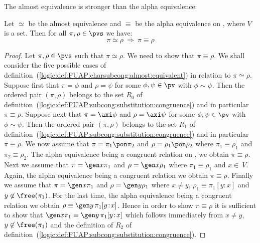 The almost equivalence is stronger than the alpha equivalence:

\begin{prop}\label{logic:prop:FUAP:subcong:almost:implies:sub:congruence}
Let $\simeq$ be the almost equivalence and $\equiv$ be the
alpha equivalence on \pvs, where $V$ is a set. Then for all
$\pi,\rho\in\pvs$ we have:
    \[
    \pi\simeq\rho\ \Rightarrow\ \pi\equiv\rho
    \]
\end{prop}
\begin{proof}
Let $\pi,\rho\in\pvs$ such that $\pi\simeq\rho$. We need to show
that $\pi\equiv\rho$. We shall consider the five possible cases of
definition~(\ref{logic:def:FUAP:charsubcong:almost:equivalent}) in
relation to $\pi\simeq\rho$. Suppose first that $\pi=\phi$ and
$\rho=\psi$ for some $\phi,\psi\in\pv$ with $\phi\sim\psi$. Then the
ordered pair $(\pi,\rho)$ belongs to the set $R_{0}$ of
definition~(\ref{logic:def:FUAP:subcong:substitution:congruence})
and in particular $\pi\equiv\rho$. Suppose next that $\pi=\axi\phi$
and $\rho=\axi\psi$ for some $\phi,\psi\in\pv$ with $\phi\sim\psi$.
Then the ordered pair $(\pi,\rho)$ belongs to the set $R_{1}$ of
definition~(\ref{logic:def:FUAP:subcong:substitution:congruence})
and in particular $\pi\equiv\rho$. We now assume that
$\pi=\pi_{1}\pon\pi_{2}$ and $\rho=\rho_{1}\pon\rho_{2}$ where
$\pi_{1}\equiv\rho_{1}$ and $\pi_{2}\equiv\rho_{2}$. The
alpha equivalence being a congruent relation on \pvs, we
obtain $\pi\equiv\rho$. Next we assume that $\pi=\gen x\pi_{1}$ and
$\rho=\gen x\rho_{1}$ where $\pi_{1}\equiv\rho_{1}$ and $x\in\ V$.
Again, the alpha equivalence being a congruent relation we
obtain $\pi\equiv\rho$. Finally we assume that $\pi=\gen x\pi_{1}$
and $\rho=\gen y\rho_{1}$ where $x\neq y$,
$\rho_{1}\equiv\pi_{1}[y\!:\!x]$ and $y\not\in\free(\pi_{1})$. For
the last time, the alpha equivalence being a congruent
relation we obtain $\rho\equiv\gen y\, \pi_{1}[y\!:\!x]$. Hence in
order to show $\pi\equiv\rho$ it is sufficient to show that $\gen
x\pi_{1}\equiv\gen y\,\pi_{1}[y\!:\!x]$ which follows immediately
from $x\neq y$, $y\not\in\free(\pi_{1})$ and the definition of
$R_{2}$ of
definition~(\ref{logic:def:FUAP:subcong:substitution:congruence}).
\end{proof}

